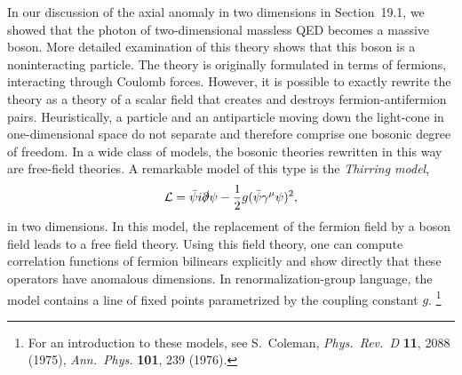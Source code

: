 In our discussion of the axial anomaly in two dimensions in Section~19.1, we
showed that the photon of two-dimensional massless QED becomes a massive
boson.  More detailed examination of this theory shows that this boson is a
noninteracting particle.  The theory is originally formulated in terms of
fermions, interacting through Coulomb forces.  However, it is possible to
exactly rewrite the theory as a theory of a scalar field that creates and
destroys fermion-antifermion pairs.  Heuristically, a particle and an
antiparticle moving down the light-cone in one-dimensional space do not
separate and therefore comprise one bosonic degree of freedom.  In a wide
class of models, the bosonic theories rewritten in this way are free-field
theories.  A remarkable model of this type is the \emph{Thirring model},
\begin{equation}
  \mathcal{L} = \bar{\psi}i\slashed{\partial}\psi
    - \frac{1}{2}g(\bar{\psi}\gamma^\mu\psi)^2 ,
  \label{eq:22.14}
\end{equation}
in two dimensions.  In this model, the replacement of the fermion field by a
boson field leads to a free field theory.  Using this field theory, one can
compute correlation functions of fermion bilinears explicitly and show
directly that these operators have anomalous dimensions.  In
renormalization-group language, the model contains a line of fixed points
parametrized by the coupling constant $g$.%
\footnote{For an introduction to these models, see S.~Coleman,
\emph{Phys.\ Rev.\ D} \textbf{11}, 2088 (1975), \emph{Ann.\ Phys.} \textbf{101},
239 (1976).}

